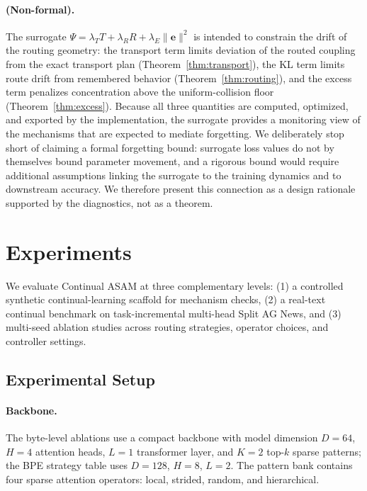 \documentclass[11pt,a4paper]{article}
\theoremstyle{definition}
\begin{document}
\paragraph{(Non-formal).} The surrogate $\Psi = \lambda_T T + \lambda_R R + \lambda_E \|\mathbf{e}\|^2$ is intended to constrain the drift of the routing geometry: the transport term limits deviation of the routed coupling from the exact transport plan (Theorem~\ref{thm:transport}), the KL term limits route drift from remembered behavior (Theorem~\ref{thm:routing}), and the excess term penalizes concentration above the uniform-collision floor (Theorem~\ref{thm:excess}). Because all three quantities are computed, optimized, and exported by the implementation, the surrogate provides a monitoring view of the mechanisms that are expected to mediate forgetting. We deliberately stop short of claiming a formal forgetting bound: surrogate loss values do not by themselves bound parameter movement, and a rigorous bound would require additional assumptions linking the surrogate to the training dynamics and to downstream accuracy. We therefore present this connection as a design rationale supported by the diagnostics, not as a theorem.

\section{Experiments}
\label{sec:experiments}

We evaluate Continual ASAM at three complementary levels: (1) a controlled synthetic continual-learning scaffold for mechanism checks, (2) a real-text continual benchmark on task-incremental multi-head Split AG News, and (3) multi-seed ablation studies across routing strategies, operator choices, and controller settings.

\subsection{Experimental Setup}

\paragraph{Backbone.} The byte-level ablations use a compact backbone with model dimension $D=64$, $H=4$ attention heads, $L=1$ transformer layer, and $K=2$ top-$k$ sparse patterns; the BPE strategy table uses $D=128$, $H=8$, $L=2$. The pattern bank contains four sparse attention operators: local, strided, random, and hierarchical.
\end{document}
